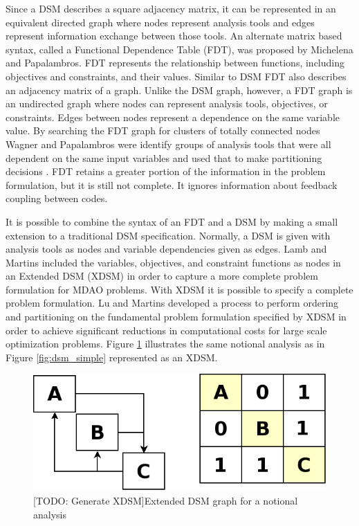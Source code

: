     Since a DSM describes a square adjacency matrix, it can be represented in an equivalent directed graph where nodes represent analysis tools and 
    edges represent information exchange between those tools. An alternate matrix based syntax, called a 
    Functional Dependence Table (FDT), was proposed by Michelena and Papalambros. 
    FDT represents the relationship between functions, including objectives and constraints, and their values\cite{Michelena1997}. Similar to DSM
    FDT also describes an adjacency matrix of a graph. Unlike the DSM graph, however, a FDT graph is an undirected 
    graph where nodes can represent analysis tools, objectives, or constraints. Edges between nodes represent a dependence on the same 
    variable value. By searching the FDT graph for clusters of totally connected nodes Wagner and Papalambros were identify groups of 
    analysis tools that were all dependent on the same input variables and used that to make partitioning decisions \cite{Wagner1993}. FDT retains 
    a greater portion of the information in the problem formulation, but it is still not complete. It ignores information about feedback coupling 
    between codes. 

    It is possible to combine the syntax of an FDT and a DSM by making a small extension to a traditional DSM specification. Normally, a DSM is given 
    with analysis tools as nodes and variable dependencies given as edges. Lamb and Martins included the variables, objectives, and constraint functions
    as nodes in an Extended DSM (XDSM)\cite{Lambe2012} in order to capture a more complete problem formulation for MDAO problems. With XDSM 
    it is possible to specify a complete problem formulation. Lu and Martins developed a process to perform ordering and partitioning on the fundamental 
    problem formulation specified by XDSM in order to achieve significant reductions in computational costs for large scale optimization problems. 
    Figure \ref{fig:dsm_full} illustrates the same notional analysis as in Figure \ref{fig:dsm_simple} represented as an XDSM.

    \begin{figure}[!hbp]
        \begin{center}
        \includegraphics[width=.75\textwidth]{images/dsm_simple}
        \caption{[TODO: Generate XDSM]Extended DSM graph for a notional analysis \label{fig:dsm_full}}
        \end{center}
    \end{figure}